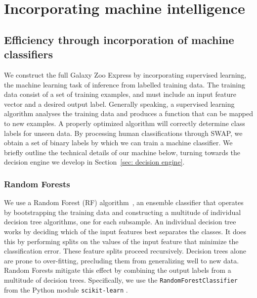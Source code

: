 
\chapter{Incorporating machine intelligence}
\label{chap:4}



\section{Efficiency through incorporation of machine classifiers} \label{sec: machine}

We construct the full Galaxy Zoo Express by incorporating supervised 
learning, the machine learning task of inference from labelled training data. 
The training data consist of a set of training examples, and must include
an input feature vector and a desired output label.  Generally speaking,
a supervised learning algorithm analyses the training data and produces a 
function that can be mapped to new examples. A properly optimized algorithm will 
correctly determine class labels for unseen data. By processing human classifications 
through SWAP, we obtain a set of binary labels by which we can train a machine 
classifier. We briefly outline the technical details of our machine below,  turning
towards the decision engine we develop in Section~\ref{sec: decision engine}. 



\subsection{Random Forests}
We use a Random Forest (RF) algorithm~\citep{Breiman2001},  
an ensemble classifier that operates by
 bootstrapping the training data and constructing a multitude of individual decision 
tree algorithms, one for each subsample.  
An individual decision tree works by deciding which of 
the input features best separates the classes. It does this by performing 
splits on the values of the input feature that minimize the classification 
error. These feature splits proceed recursively. Decision trees alone are
 prone to over-fitting, precluding them from generalizing 
well to new data. Random Forests mitigate this effect by combining the 
output labels from a multitude of decision trees.  Specifically, we use the 
\texttt{RandomForestClassifier} from the Python module \texttt{scikit-learn}
\citep{scikit-learn}. 


